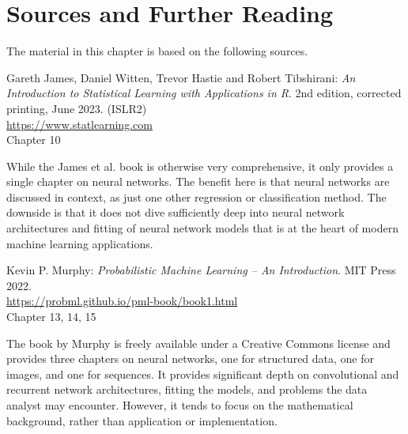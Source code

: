 %
%


\section*{Sources and Further Reading}

The material in this chapter is based on the following sources. 

\begin{tcolorbox}[colback=alert]
Gareth James, Daniel Witten, Trevor Hastie and Robert Tibshirani: \emph{An Introduction to Statistical Learning with Applications in R}. 2nd edition, corrected printing, June 2023. (ISLR2) \\

\url{https://www.statlearning.com} \\

Chapter 10
\end{tcolorbox}

While the James et al. book is otherwise very comprehensive, it only provides a single chapter on neural networks. The benefit here is that neural networks are discussed in context, as just one other regression or classification method. The downside is that it does not dive sufficiently deep into neural network architectures and fitting of neural network models that is at the heart of modern machine learning applications.

\begin{tcolorbox}[colback=alert]
Kevin P. Murphy: \emph{Probabilistic Machine Learning -- An Introduction}. MIT Press 2022. \\

\url{https://probml.github.io/pml-book/book1.html} \\

Chapter 13, 14, 15
\end{tcolorbox}

The book by Murphy is freely available under a Creative Commons license and provides three chapters on neural networks, one for structured data, one for images, and one for sequences. It provides significant depth on convolutional and recurrent network architectures, fitting the models, and problems the data analyst may encounter. However, it tends to focus on the mathematical background, rather than application or implementation.

